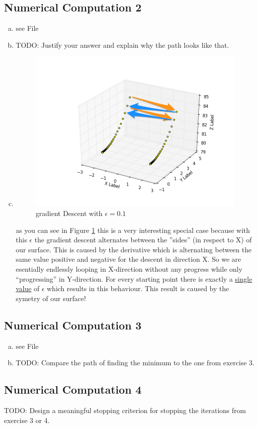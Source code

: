 \documentclass[12pt]{article}
\begin{document}
\subsection{Numerical Computation 2}
\begin{enumerate}[a)]
    \item 
        see File
    \item
        TODO: Justify your answer and explain why the path looks like that.
    \item
        \begin{figure}[H]
            \centering
            \includegraphics[width=300pt]{pictures/figure_1.png}
            \caption{gradient Descent with $\epsilon = 0.1$}
            \label{fig:fig1}
        \end{figure}
        as you can see in Figure \ref{fig:fig1} this is a very interesting special case because with this $\epsilon$ the gradient descent alternates between the ''sides'' (in respect to X) of our surface. This is caused by the derivative which is alternating between the same value positive and negative for the descent in direction X. So we are esentially endlessly looping in X-direction without any progress while only ``progressing'' in Y-direction. For every starting point there is exactly a \underline{single value} of $\epsilon$ which results in this behaviour. This result is caused by the symetry of our surface!
\end{enumerate}


\subsection{Numerical Computation 3}
\begin{enumerate}[a)]
    \item 
        see File
    \item
        TODO: Compare the path of finding the minimum to the one from exercise 3.
\end{enumerate}


\subsection{Numerical Computation 4}
TODO: Design a meaningful stopping criterion for stopping the iterations from exercise 3 or 4.
\end{document}

